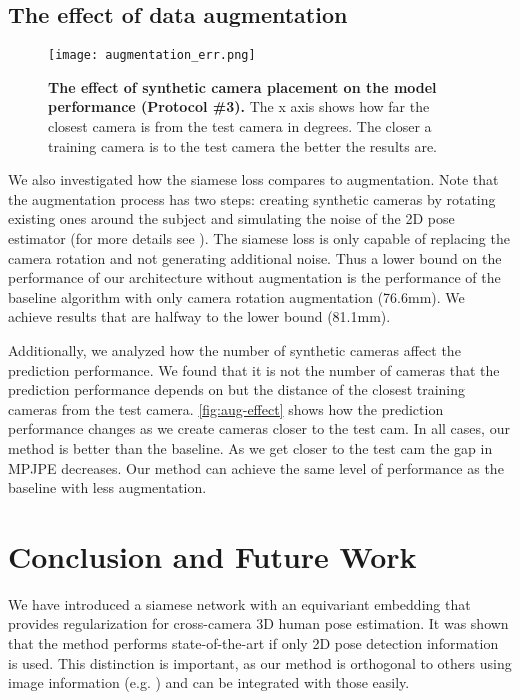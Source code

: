 \documentclass[preprint]{elsarticle}
\begin{document}
\subsection{The effect of data augmentation}
\begin{figure}[ht]
    \centering
    \texttt{[image: augmentation\_err.png]}
    \caption{\textbf{The effect of synthetic camera placement on the model performance (Protocol \#3).} The x axis shows how far the closest camera is from the test camera in degrees. The closer a training camera is to the test camera the better the results are.}
    \label{fig:aug-effect}
\end{figure}

We also investigated how the siamese loss compares to augmentation. Note that the augmentation process has two steps: creating synthetic cameras by rotating existing ones around the subject and simulating the noise of the 2D pose estimator (for more details see \cite{fang2018posegrammar}). The siamese loss is only capable of replacing the camera rotation and not generating additional noise. Thus a lower bound on the performance of our architecture without augmentation is the performance of the baseline algorithm with only camera rotation augmentation (76.6mm). We achieve results that are halfway to the lower bound (81.1mm). 

Additionally, we analyzed how the number of synthetic cameras  affect the prediction performance. We found that it is not the number of cameras that the prediction performance depends on but the distance of the closest training cameras from the test camera. \autoref{fig:aug-effect} shows how the prediction performance changes as we create cameras closer to the test cam. In all cases, our method is better than the baseline. As we get closer to the test cam the gap in MPJPE decreases. Our method can achieve the same level of performance as the baseline with less augmentation.

\section{Conclusion and Future Work}
We have introduced a siamese network with an equivariant embedding that provides regularization for cross-camera 3D human pose estimation. It was shown that the method performs state-of-the-art if only 2D pose detection information is used. This distinction is important, as our method is orthogonal to others using image information (e.g. \cite{integralPose,drpose}) and can be integrated with those easily.
\end{document}
